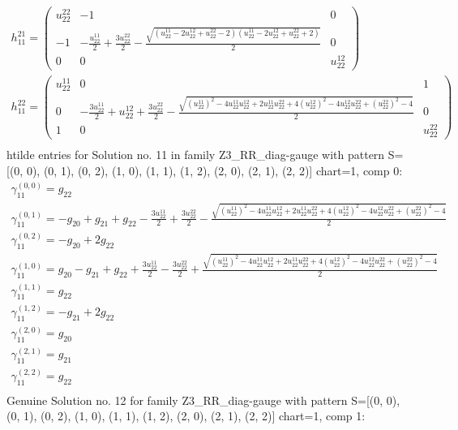 \documentclass[a4paper, 11pt, twoside, onecolumn]{article}
\begin{document}
\begin{landscape}
\begin{gather*}
	 h_11^{21}=\begin{pmatrix}u^{22}_{22} & -1 & 0\\-1 & - \frac{u^{11}_{22}}{2} + \frac{3 u^{22}_{22}}{2} - \frac{\sqrt{\left(u^{11}_{22} - 2 u^{12}_{22} + u^{22}_{22} - 2\right) \left(u^{11}_{22} - 2 u^{12}_{22} + u^{22}_{22} + 2\right)}}{2} & 0\\0 & 0 & u^{12}_{22}\end{pmatrix}\\ 
	 h_11^{22}=\begin{pmatrix}u^{11}_{22} & 0 & 1\\0 & - \frac{3 u^{11}_{22}}{2} + u^{12}_{22} + \frac{3 u^{22}_{22}}{2} - \frac{\sqrt{\left(u^{11}_{22}\right)^{2} - 4 u^{11}_{22} u^{12}_{22} + 2 u^{11}_{22} u^{22}_{22} + 4 \left(u^{12}_{22}\right)^{2} - 4 u^{12}_{22} u^{22}_{22} + \left(u^{22}_{22}\right)^{2} - 4}}{2} & 0\\1 & 0 & u^{22}_{22}\end{pmatrix}\\ 
\end{gather*} 
htilde entries for Solution no. 11 in family Z3_RR_diag-gauge with pattern S=[(0, 0), (0, 1), (0, 2), (1, 0), (1, 1), (1, 2), (2, 0), (2, 1), (2, 2)] chart=1, comp 0: 
\begin{gather*} 
	 \gamma^{(0, 0)}_11=g_{22}\\ 
	 \gamma^{(0, 1)}_11=- g_{20} + g_{21} + g_{22} - \frac{3 u^{11}_{22}}{2} + \frac{3 u^{22}_{22}}{2} - \frac{\sqrt{\left(u^{11}_{22}\right)^{2} - 4 u^{11}_{22} u^{12}_{22} + 2 u^{11}_{22} u^{22}_{22} + 4 \left(u^{12}_{22}\right)^{2} - 4 u^{12}_{22} u^{22}_{22} + \left(u^{22}_{22}\right)^{2} - 4}}{2}\\ 
	 \gamma^{(0, 2)}_11=- g_{20} + 2 g_{22}\\ 
	 \gamma^{(1, 0)}_11=g_{20} - g_{21} + g_{22} + \frac{3 u^{11}_{22}}{2} - \frac{3 u^{22}_{22}}{2} + \frac{\sqrt{\left(u^{11}_{22}\right)^{2} - 4 u^{11}_{22} u^{12}_{22} + 2 u^{11}_{22} u^{22}_{22} + 4 \left(u^{12}_{22}\right)^{2} - 4 u^{12}_{22} u^{22}_{22} + \left(u^{22}_{22}\right)^{2} - 4}}{2}\\ 
	 \gamma^{(1, 1)}_11=g_{22}\\ 
	 \gamma^{(1, 2)}_11=- g_{21} + 2 g_{22}\\ 
	 \gamma^{(2, 0)}_11=g_{20}\\ 
	 \gamma^{(2, 1)}_11=g_{21}\\ 
	 \gamma^{(2, 2)}_11=g_{22}\\ 
\end{gather*} 
Genuine Solution no. 12 for family Z3_RR_diag-gauge with pattern S=[(0, 0), (0, 1), (0, 2), (1, 0), (1, 1), (1, 2), (2, 0), (2, 1), (2, 2)] chart=1, comp 1: 

\end{landscape}
\end{document}
